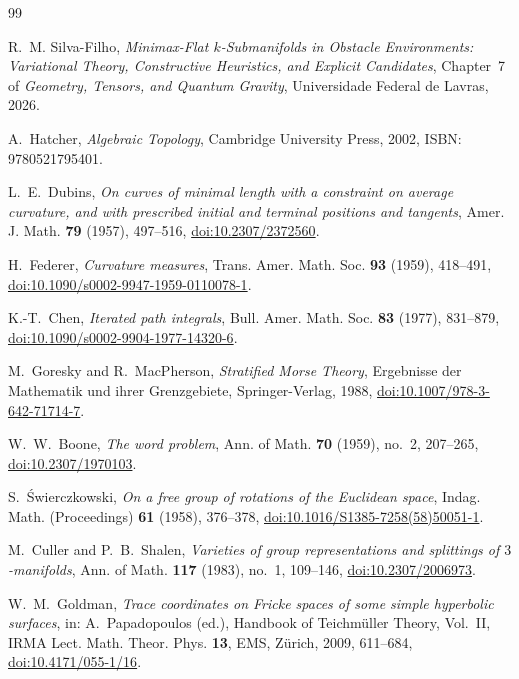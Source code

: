 \documentclass[11pt,reqno]{amsart}
\theoremstyle{definition}
\numberwithin{equation}{section}
\begin{document}
\begin{thebibliography}{99}

 R.~M. Silva-Filho, \emph{Minimax-Flat $k$-Submanifolds in Obstacle Environments: Variational Theory, Constructive Heuristics, and Explicit Candidates}, Chapter~7 of \emph{Geometry, Tensors, and Quantum Gravity}, Universidade Federal de Lavras, 2026.

A.~Hatcher,
\emph{Algebraic Topology},
Cambridge University Press, 2002, ISBN: 9780521795401.

L.~E.~Dubins,
\emph{On curves of minimal length with a constraint on average curvature, and with prescribed initial and terminal positions and tangents},
Amer. J. Math. \textbf{79} (1957), 497--516, \href{https://doi.org/10.2307/2372560}{doi:10.2307/2372560}.

H.~Federer,
\emph{Curvature measures},
Trans. Amer. Math. Soc. \textbf{93} (1959), 418--491, \href{https://doi.org/10.1090/s0002-9947-1959-0110078-1}{doi:10.1090/s0002-9947-1959-0110078-1}.

K.-T.~Chen,
\emph{Iterated path integrals},
Bull. Amer. Math. Soc. \textbf{83} (1977), 831--879, \href{https://doi.org/10.1090/s0002-9904-1977-14320-6}{doi:10.1090/s0002-9904-1977-14320-6}.

M.~Goresky and R.~MacPherson,
\emph{Stratified Morse Theory},
Ergebnisse der Mathematik und ihrer Grenzgebiete, Springer-Verlag, 1988, \href{https://doi.org/10.1007/978-3-642-71714-7}{doi:10.1007/978-3-642-71714-7}.

W.~W.~Boone,
\emph{The word problem},
Ann. of Math. \textbf{70} (1959), no.~2, 207--265, \href{https://doi.org/10.2307/1970103}{doi:10.2307/1970103}.

S.~\'Swierczkowski,
\emph{On a free group of rotations of the Euclidean space},
Indag. Math. (Proceedings) \textbf{61} (1958), 376--378, \href{https://doi.org/10.1016/S1385-7258(58)50051-1}{doi:10.1016/S1385-7258(58)50051-1}.

M.~Culler and P.~B.~Shalen,
\emph{Varieties of group representations and splittings of $3$-manifolds},
Ann. of Math. \textbf{117} (1983), no.~1, 109--146, \href{https://doi.org/10.2307/2006973}{doi:10.2307/2006973}.

W.~M.~Goldman,
\emph{Trace coordinates on Fricke spaces of some simple hyperbolic surfaces},
in: A.~Papadopoulos (ed.), Handbook of Teichm\"uller Theory, Vol.~II, IRMA Lect. Math. Theor. Phys. \textbf{13}, EMS, Z\"urich, 2009, 611--684, \href{https://doi.org/10.4171/055-1/16}{doi:10.4171/055-1/16}.


\end{thebibliography}
\end{document}
